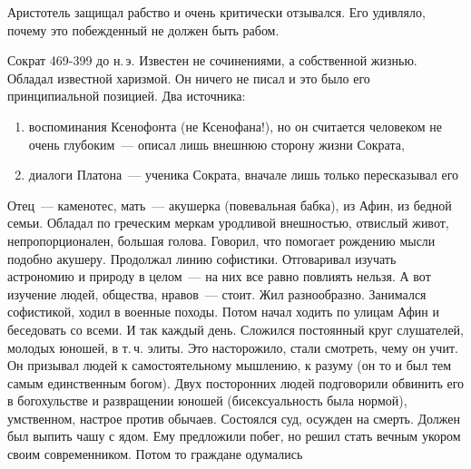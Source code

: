 Аристотель защищал рабство и очень критически отзывался. Его удивляло, почему это побежденный не должен быть рабом. 

Сократ
469-399 до н.\,э. 
Известен не сочинениями, а собственной жизнью. Обладал известной харизмой. Он ничего не писал и это было его принципиальной позицией. Два источника: 

\begin{enumerate}
	\item воспоминания Ксенофонта (не Ксенофана!), но он считается человеком не очень глубоким~--- описал лишь внешнюю сторону жизни Сократа, 
	\item диалоги Платона~--- ученика Сократа, вначале лишь только пересказывал его
\end{enumerate}

Отец~--- каменотес, мать~--- акушерка (повевальная бабка), из Афин, из бедной семьи. Обладал по греческим меркам уродливой внешностью, отвислый живот, непропорционален, большая голова. 
Говорил, что помогает рождению мысли подобно акушеру. Продолжал линию софистики. Отговаривал изучать астрономию и природу в целом~--- на них все равно повлиять нельзя. А вот изучение людей, общества, нравов~--- стоит. 
Жил разнообразно. Занимался софистикой, ходил в военные походы. Потом начал ходить по улицам Афин и беседовать со всеми. И так каждый день. 
Сложился постоянный круг слушателей, молодых юношей, в т.\,ч. элиты. Это насторожило, стали смотреть, чему он учит. 
Он призывал людей к самостоятельному мышлению, к разуму (он то и был тем самым единственным богом). 
Двух посторонних людей подговорили обвинить его в богохульстве и развращении юношей (бисексуальность была нормой), умственном, настрое против обычаев. 
Состоялся суд, осужден на смерть. Должен был выпить чашу с ядом. Ему предложили побег, но решил стать вечным укором своим современником. Потом то граждане одумались
